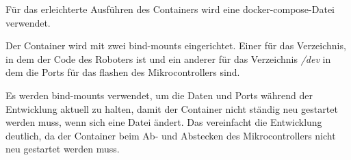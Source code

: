 \begin{flushleft}
    Für das erleichterte Ausführen des Containers wird eine docker-compose-Datei verwendet.

    Der Container wird mit zwei bind-mounts eingerichtet. Einer für das Verzeichnis, 
    in dem der Code des Roboters ist und ein anderer für das Verzeichnis \textit{/dev} in dem die Ports für das flashen des Mikrocontrollers sind.

    Es werden bind-mounts verwendet, um die Daten und Ports während der Entwicklung aktuell zu halten, damit der Container nicht ständig neu gestartet werden muss, wenn sich eine Datei ändert.
    Das vereinfacht die Entwicklung deutlich, da der Container beim Ab- und Abstecken des Mikrocontrollers nicht neu gestartet werden muss. 
    
\end{flushleft}